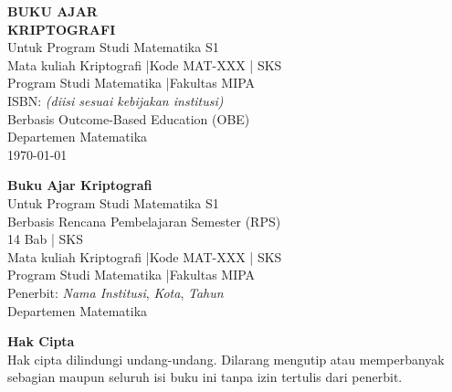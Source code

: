 \documentclass[12pt,a4paper]{book}
\begin{document}
\newcommand{\InMainDocument}{}
\hypersetup{pageanchor=false}

\begin{titlepage}
\centering
\vspace*{2cm}
{\LARGE \textbf{BUKU AJAR}}\\[1cm]
{\Huge \textbf{KRIPTOGRAFI}}\\[0.5cm]
{\Large Untuk Program Studi Matematika S1}\\[0.8cm]
{\normalsize Mata kuliah Kriptografi \quad|\quad Kode MAT-XXX \quad| SKS}\\[0.3cm]
{\normalsize Program Studi Matematika \quad|\quad Fakultas MIPA}\\[0.3cm]
{\normalsize ISBN: \textit{(diisi sesuai kebijakan institusi)}}\\[1.6cm]
{\large Berbasis Outcome-Based Education (OBE)}\\[3cm]
{\large Departemen Matematika}\\[0.5cm]
{\large \today}
\end{titlepage}

\newpage
\thispagestyle{empty}
\centering
\vspace*{2.5cm}
{\Huge \textbf{Buku Ajar Kriptografi}}\\[1cm]
{\Large Untuk Program Studi Matematika S1}\\[1.2cm]
{\large Berbasis Rencana Pembelajaran Semester (RPS)}\\[0.8cm]
{\large 14 Bab \quad| SKS}\\[1.2cm]
\vspace{0.5cm}
{\normalsize
Mata kuliah Kriptografi \quad|\quad Kode MAT-XXX \quad| SKS\\
Program Studi Matematika \quad|\quad Fakultas MIPA\\
Penerbit: \textit{Nama Institusi}, \textit{Kota}, \textit{Tahun}
}\\[2.5cm]
{\large Departemen Matematika}

\newpage
\thispagestyle{empty}
\vspace*{1.5cm}
\noindent
\textbf{Hak Cipta}\\[0.3em]
Hak cipta dilindungi undang-undang. Dilarang mengutip atau memperbanyak sebagian maupun seluruh isi buku ini tanpa izin tertulis dari penerbit.\\[1.2cm]
\end{document}
